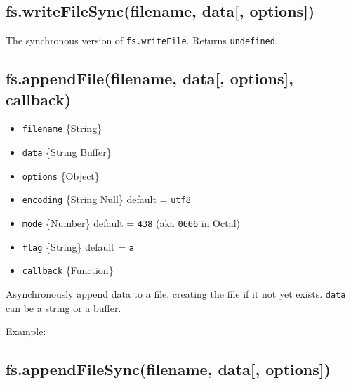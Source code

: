 \subsection{fs.writeFileSync(filename, data{[},
options{]})}\label{fs.writefilesyncfilename-data-options}

The synchronous version of \texttt{fs.writeFile}. Returns
\texttt{undefined}.

\subsection{fs.appendFile(filename, data{[}, options{]},
callback)}\label{fs.appendfilefilename-data-options-callback}

\begin{itemize}
\itemsep1pt\parskip0pt
\item
  \texttt{filename} \{String\}
\item
  \texttt{data} \{String \textbar{} Buffer\}
\item
  \texttt{options} \{Object\}
\item
  \texttt{encoding} \{String \textbar{} Null\} default =
  \texttt{\textquotesingle{}utf8\textquotesingle{}}
\item
  \texttt{mode} \{Number\} default = \texttt{438} (aka \texttt{0666} in
  Octal)
\item
  \texttt{flag} \{String\} default =
  \texttt{\textquotesingle{}a\textquotesingle{}}
\item
  \texttt{callback} \{Function\}
\end{itemize}

Asynchronously append data to a file, creating the file if it not yet
exists. \texttt{data} can be a string or a buffer.

Example:

\begin{Shaded}
\begin{Highlighting}[]
\NormalTok{(}\NormalTok{, }\NormalTok{, } 
    
  \NormalTok{(}\NormalTok{);}
\NormalTok{\});}
\end{Highlighting}
\end{Shaded}

\subsection{fs.appendFileSync(filename, data{[},
options{]})}\label{fs.appendfilesyncfilename-data-options}

